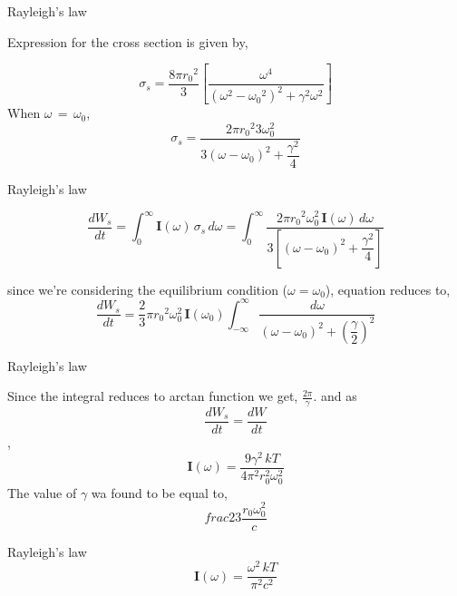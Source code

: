 \documentclass[aspectratio=169]{beamer}
\begin{document}
\begin{frame}{Rayleigh's law}
	\begin{center}
		Expression for the cross section is given by,
	\end{center}
	
	{\large \[ \sigma_s = \frac{8\pi {r_0}^{2}}{3} \left[ \frac{\omega^{4}}{(\omega^2-{\omega_0}^{2})^2+\gamma^2 \omega^2}\right] \]}\newline
	When $ \omega\,=\,\omega_0 $, \newline 		
	{\large \[ \sigma_s = \frac{2\pi {r_0}^{2}{3} \omega_0^{2}}{3(\omega-\omega_0)^2+\dfrac{\gamma^2}{4}} \]}
	
\end{frame}
				
\begin{frame}{Rayleigh's law}

	\[ \frac{dW_s}{dt}=\int_0^{\infty}{\mathbf{I}(\omega)\,\sigma_s \, d\omega} = \int_0^{\infty}{\frac{2\pi {r_0}^{2} \omega_0^{2} \, \mathbf{I}(\omega)\, d\omega}{3 \left[ (\omega-\omega_0)^2+\dfrac{\gamma^2}{4} \right] }} \] \newline

	since we're considering the equilibrium condition ($\omega =\omega_0 $), equation reduces to,
	\[ \frac{dW_s}{dt}= \frac{2}{3}\pi {r_0}^{2} \omega_0^{2} \, \mathbf{I}(\omega_0) \int_{-\infty}^{\infty}{\frac{d\omega}{(\omega-\omega_0)^2+{\left(  \dfrac{\gamma}{2} \right)}^{2}}}  \]

\end{frame}

\begin{frame}{Rayleigh's law}\vspace{1cm}

	Since the integral reduces to arctan function we get, $\frac{2\pi}{\gamma}$. and as 
		\[\frac{dW_s}{dt}= \frac{dW}{dt}\],
		\[\mathbf{I}(\omega)=\frac{9\gamma^2\,kT}{4\pi^2 r_0^2\omega_0^2} \] 
	The value of $\gamma$ wa found to be equal to,
		\[ frac{2}{3} \frac{r_0 \omega_0^2}{c} \]
	
\end{frame}

\begin{frame}{Rayleigh's law}
	 \[\mathbf{I}(\omega)=\frac{\omega^2\,kT}{\pi^2 c^2} \] 
\end{frame}
\end{document}
